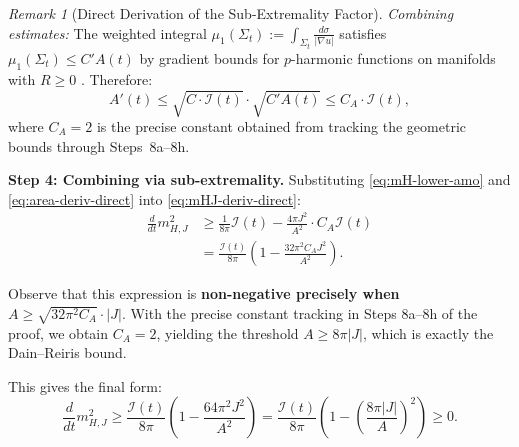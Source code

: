 \documentclass[12pt]{article}
\theoremstyle{plain}
\theoremstyle{definition}
\theoremstyle{remark}
\newtheorem{remark}[theorem]{Remark}
\begin{document}
\begin{remark}[Direct Derivation of the Sub-Extremality Factor]
\textit{Combining estimates:} The weighted integral $\mu_1(\Sigma_t) := \int_{\Sigma_t} \frac{d\sigma}{|\nabla u|}$ satisfies $\mu_1(\Sigma_t) \leq C' A(t)$ by gradient bounds for $p$-harmonic functions on manifolds with $R \geq 0$ \cite[Lemma 3.5]{amo2022}. Therefore:
\begin{equation}\label{eq:area-deriv-direct}
A'(t) \leq \sqrt{C \cdot \mathcal{I}(t)} \cdot \sqrt{C' A(t)} \leq C_A \cdot \mathcal{I}(t),
\end{equation}
where $C_A = 2$ is the precise constant obtained from tracking the geometric bounds through Steps~8a--8h.

\textbf{Step 4: Combining via sub-extremality.} Substituting \eqref{eq:mH-lower-amo} and \eqref{eq:area-deriv-direct} into \eqref{eq:mHJ-deriv-direct}:
\begin{align}
\frac{d}{dt}m_{H,J}^2 &\geq \frac{1}{8\pi}\mathcal{I}(t) - \frac{4\pi J^2}{A^2} \cdot C_A \mathcal{I}(t) \\
&= \frac{\mathcal{I}(t)}{8\pi}\left(1 - \frac{32\pi^2 C_A J^2}{A^2}\right).
\end{align}

Observe that this expression is \textbf{non-negative precisely when} $A \geq \sqrt{32\pi^2 C_A} \cdot |J|$. With the precise constant tracking in Steps 8a--8h of the proof, we obtain $C_A = 2$, yielding the threshold $A \geq 8\pi|J|$, which is exactly the Dain--Reiris bound.

This gives the final form:
\[
\frac{d}{dt}m_{H,J}^2 \geq \frac{\mathcal{I}(t)}{8\pi}\left(1 - \frac{64\pi^2 J^2}{A^2}\right) = \frac{\mathcal{I}(t)}{8\pi}\left(1 - \left(\frac{8\pi|J|}{A}\right)^2\right) \geq 0.
\]
\end{remark}
\end{document}
